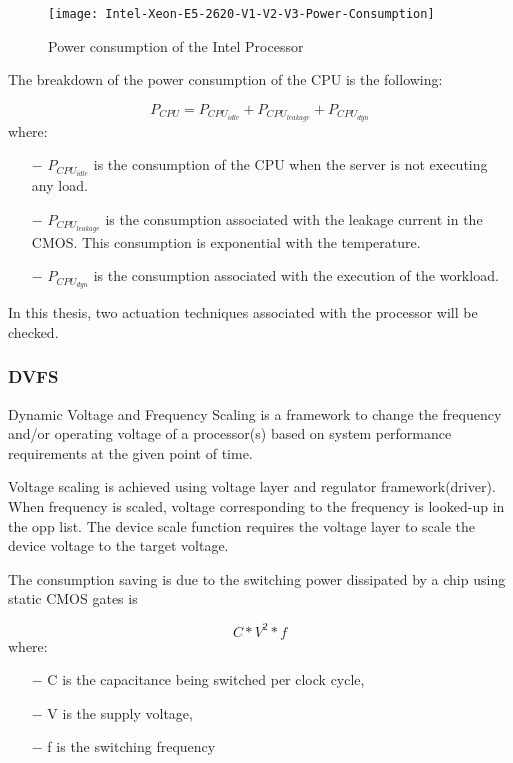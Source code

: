 \begin{figure}[H]
\begin{center}
\texttt{[image: Intel-Xeon-E5-2620-V1-V2-V3-Power-Consumption]} %
\caption{Power consumption of the Intel Processor \cite{procGrafica}}
\label{fig:Intel-Xeon-E5-2620-V1-V2-V3-Power-Consumption}
\end{center}
\end{figure}

The breakdown of the power consumption of the CPU is the following:

\begin{equation*}
P_{CPU} = P_{CPU_{idle}} + P_{CPU_{leakage}} + P_{CPU_{dyn}} 
\end{equation*}
where:
\begin{itemize}
    \item[$-$] $P_{CPU_{idle}}$ is the consumption of the CPU when the server is not executing any load.
    \item[$-$] $P_{CPU_{leakage}}$ is the consumption associated with the leakage current in the CMOS. This consumption is exponential with the temperature.
    \item[$-$] $P_{CPU_{dyn}}$ is the consumption associated with the execution of the workload.
\end{itemize}


In this thesis, two actuation techniques associated with the processor will be checked.

\subsubsection{DVFS}

Dynamic Voltage and Frequency Scaling is a framework to change the frequency and/or operating voltage of a processor(s) based on system performance requirements at the given point of time.

Voltage scaling is achieved using voltage layer and regulator framework(driver). When frequency is scaled, voltage corresponding to the frequency is looked-up in the opp list. The device scale function requires the voltage layer to scale the device voltage to the target voltage.

The consumption saving is due to the switching power dissipated by a chip using static CMOS gates is 

\begin{equation*}
C * {V}^{2} * f
\end{equation*}
where:
\begin{itemize}
    \item[$-$] C is the capacitance being switched per clock cycle,
    \item[$-$] V is the supply voltage,
    \item[$-$] f is the switching frequency
\end{itemize}

